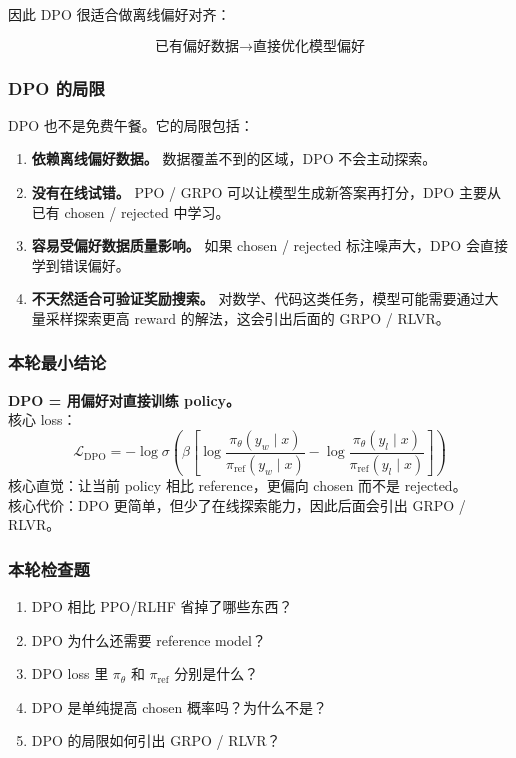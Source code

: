 因此 DPO 很适合做离线偏好对齐：

\[
\text{已有偏好数据}
\to
\text{直接优化模型偏好}
\]

\subsubsection{DPO 的局限}

DPO 也不是免费午餐。它的局限包括：

\begin{enumerate}[leftmargin=1.5em]
  \item \textbf{依赖离线偏好数据。} 数据覆盖不到的区域，DPO 不会主动探索。
  \item \textbf{没有在线试错。} PPO / GRPO 可以让模型生成新答案再打分，DPO 主要从已有 chosen / rejected 中学习。
  \item \textbf{容易受偏好数据质量影响。} 如果 chosen / rejected 标注噪声大，DPO 会直接学到错误偏好。
  \item \textbf{不天然适合可验证奖励搜索。} 对数学、代码这类任务，模型可能需要通过大量采样探索更高 reward 的解法，这会引出后面的 GRPO / RLVR。
\end{enumerate}

\subsubsection{本轮最小结论}

\begin{summarybox}
\textbf{DPO = 用偏好对直接训练 policy。}\\
核心 loss：
\[
\mathcal{L}_\text{DPO}
=
-
\log
\sigma
\left(
\beta
\left[
\log
\frac{\pi_\theta(y_w \mid x)}{\pi_\text{ref}(y_w \mid x)}
-
\log
\frac{\pi_\theta(y_l \mid x)}{\pi_\text{ref}(y_l \mid x)}
\right]
\right)
\]
核心直觉：让当前 policy 相比 reference，更偏向 chosen 而不是 rejected。\\
核心代价：DPO 更简单，但少了在线探索能力，因此后面会引出 GRPO / RLVR。
\end{summarybox}

\subsubsection{本轮检查题}

\begin{enumerate}[leftmargin=1.5em]
  \item DPO 相比 PPO/RLHF 省掉了哪些东西？
  \item DPO 为什么还需要 reference model？
  \item DPO loss 里 $\pi_\theta$ 和 $\pi_\text{ref}$ 分别是什么？
  \item DPO 是单纯提高 chosen 概率吗？为什么不是？
  \item DPO 的局限如何引出 GRPO / RLVR？
\end{enumerate}
